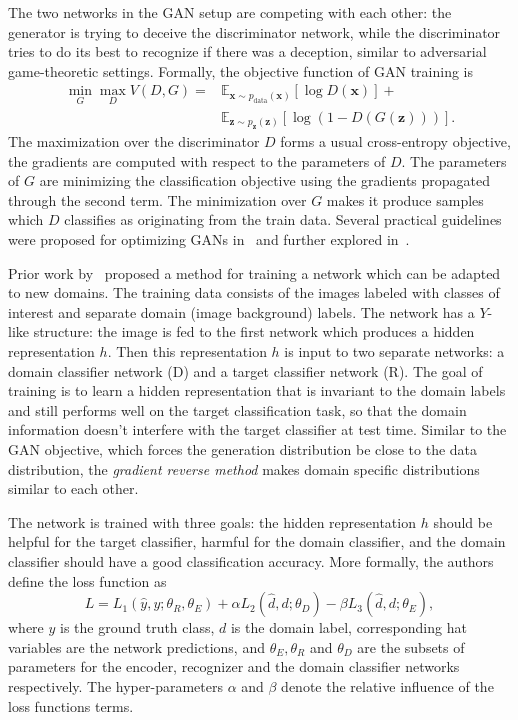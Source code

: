 \documentclass[a4paper]{article}
\begin{document}
    The two networks in the GAN setup are competing with each other: the 
    generator is trying to deceive the discriminator network, while the discriminator tries
    to do its best to recognize if there was a deception, similar to adversarial game-theoretic settings.    
    Formally, the objective function of GAN training is
    \begin{align*}
        \min_G \max_D V(D, G) = &\mathbb{E}_{\bm{x} \sim p_{\text{data}}(\bm{x})}[\log D(\bm{x})] + \\
            &\mathbb{E}_{\bm{z} \sim p_{\bm{z}}(\bm{z})}[\log (1 - D(G(\bm{z})))].
    \end{align*}
    The maximization over the discriminator $D$ forms a usual cross-entropy objective, the gradients are
    computed with respect to the parameters of $D$. The parameters of $G$ are
    minimizing the classification objective using the gradients
    propagated through the second term. The minimization over $G$ makes it
    produce samples which $D$ classifies as originating from the train data.
    Several practical guidelines were proposed for optimizing GANs in~\cite{radford2015unsupervised} and 
    further explored in~\cite{salimans2016improved}.
    
    Prior work by~\cite{ganin2014unsupervised} proposed a method for training a network 
    which can be adapted to new domains. The training data consists of the images
    labeled with classes of interest and separate domain (image background) labels. 
    The network has a $Y$-like structure: the image is fed to the
    first network which produces a hidden representation $h$. Then this 
    representation $h$ is input to two separate networks: a domain classifier network (D) and 
    a target classifier network (R). The goal of training is to learn a hidden 
    representation that is invariant to the domain labels and still performs well on 
    the target classification task, so that the domain information doesn't 
    interfere with the target classifier at test time. Similar to the GAN 
    objective, which forces the generation distribution be close to the data distribution,
    the \emph{gradient reverse method} makes domain specific distributions similar to each other.

    The network is trained with three goals: the hidden representation $h$ should
    be helpful for the target classifier, harmful for the domain classifier,
    and the domain classifier should have a good classification accuracy. More 
    formally, the authors define the loss function as
    \begin{equation}
        L = L_1(\hat{y}, y; \theta_R, \theta_E) + 
        \alpha L_2(\hat{d}, d; \theta_D) -
        \beta L_3(\hat{d}, d; \theta_E),
        \label{eq:grm}
    \end{equation}
    where $y$ is the ground truth class, $d$ is the domain label, corresponding
    hat variables are the network predictions, and $\theta_E, \theta_R$ and 
    $\theta_D$ are the subsets of  parameters for the encoder,
    recognizer and the domain classifier networks respectively. The hyper-parameters
    $\alpha$ and $\beta$ denote the relative influence of the loss functions terms.
\end{document}

